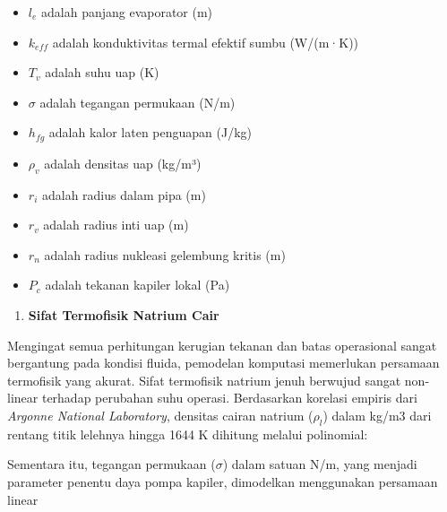 \documentclass[
]{article}
\providecommand{\tightlist}{%
  \setlength{\itemsep}{0pt}\setlength{\parskip}{0pt}}
\begin{document}
\begin{itemize}
\tightlist
\item
  \({l}_{e}\) adalah panjang evaporator (m)\\
\item
  \({k}_{eff}\) adalah konduktivitas termal efektif sumbu (W/(m·K))\\
\item
  \({T}_{v}\) adalah suhu uap (K)\\
\item
  \(\sigma\) adalah tegangan permukaan (N/m)\\
\item
  \({h}_{fg}\) adalah kalor laten penguapan (J/kg)\\
\item
  \({\rho }_{v}\) adalah densitas uap (kg/m³)\\
\item
  \({r}_{i}\) adalah radius dalam pipa (m)\\
\item
  \({r}_{v}\) adalah radius inti uap (m)\\
\item
  \({r}_{n}\) adalah radius nukleasi gelembung kritis (m)\\
\item
  \({P}_{c}\) adalah tekanan kapiler lokal (Pa)\\
\end{itemize}

\begin{enumerate}
\def\labelenumi{\arabic{enumi}.}
\setcounter{enumi}{3}
\tightlist
\item
  \textbf{Sifat Termofisik Natrium Cair}
\end{enumerate}

Mengingat semua perhitungan kerugian tekanan dan batas operasional
sangat bergantung pada kondisi fluida, pemodelan komputasi memerlukan
persamaan termofisik yang akurat. Sifat termofisik natrium jenuh
berwujud sangat non-linear terhadap perubahan suhu operasi. Berdasarkan
korelasi empiris dari \emph{Argonne National Laboratory}, densitas
cairan natrium (\({\rho }_{l}\)) dalam kg/m3 dari rentang titik lelehnya
hingga 1644 K dihitung melalui polinomial:

\href{https://www.codecogs.com/eqnedit.php?latex=\%5Crho\%7B\%7D_l\%3D1011.8-0.22054T-1.9226\%5Ctimes\%7B\%7D10\%5E\%7B-5\%7DT\%5E2\%2B5.6371\%5Ctimes\%7B\%7D10\%5E\%7B-9\%7DT\%5E3\#0}{}

Sementara itu, tegangan permukaan (\(\sigma\)) dalam satuan N/m, yang
menjadi parameter penentu daya pompa kapiler, dimodelkan menggunakan
persamaan linear
\end{document}
